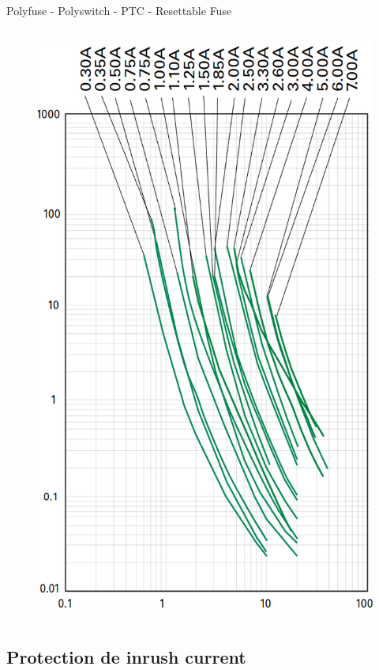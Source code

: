 \begin{frame}{Polyfuse - Polyswitch - PTC - Resettable Fuse}
\begin{columns}
        \begin{column}{0.4\textwidth}
            \begin{figure}
                \centering
                \includegraphics[width=\textwidth, height=0.75\textheight, keepaspectratio]{pictures/polyfuse-curve.png}
            \end{figure}
        \end{column}
    \end{columns}
\end{frame}

\subsection{Protection de inrush current}

